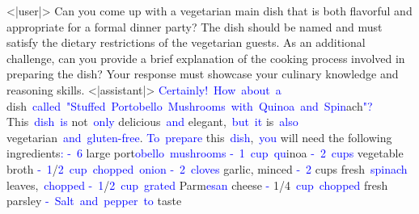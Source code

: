 \documentclass{article}
\begin{document}
\begin{tcolorbox}[colframe=black,colback=white]
<|user|>
Can you come up with a vegetarian main dish that is both flavorful and appropriate for a formal dinner party? The dish should be named and must satisfy the dietary restrictions of the vegetarian guests. As an additional challenge, can you provide a brief explanation of the cooking process involved in preparing the dish? Your response must showcase your culinary knowledge and reasoning skills.
<|assistant|>
\textcolor{blue}{Certainly}\textcolor{blue}{!}\textcolor{blue}{~How}\textcolor{blue}{~about}\textcolor{blue}{~a} dish\textcolor{blue}{~called}\textcolor{blue}{~"}\textcolor{blue}{St}\textcolor{blue}{uffed}\textcolor{blue}{~Port}\textcolor{blue}{ob}\textcolor{blue}{ello}\textcolor{blue}{~Mush}\textcolor{blue}{rooms}\textcolor{blue}{~with}\textcolor{blue}{~Qu}\textcolor{blue}{inoa}\textcolor{blue}{~and}\textcolor{blue}{~Spin}ach\textcolor{blue}{"?} This\textcolor{blue}{~dish}\textcolor{blue}{~is} not\textcolor{blue}{~only} delicious\textcolor{blue}{~and} elegant,\textcolor{blue}{~but}\textcolor{blue}{~it} is\textcolor{blue}{~also} vegetarian\textcolor{blue}{~and}\textcolor{blue}{~gluten}\textcolor{blue}{-free}.
\textcolor{blue}{To}\textcolor{blue}{~prepare} this\textcolor{blue}{~dish},\textcolor{blue}{~you} will need the following ingredients\textcolor{blue}{:
}\textcolor{blue}{-}\textcolor{blue}{~}\textcolor{blue}{6} large port\textcolor{blue}{ob}\textcolor{blue}{ello}\textcolor{blue}{~mushrooms}\textcolor{blue}{
}\textcolor{blue}{-}\textcolor{blue}{~}\textcolor{blue}{1}\textcolor{blue}{~cup}\textcolor{blue}{~qu}inoa\textcolor{blue}{
}\textcolor{blue}{-}\textcolor{blue}{~}\textcolor{blue}{2}\textcolor{blue}{~cups} vegetable broth\textcolor{blue}{
}\textcolor{blue}{-}\textcolor{blue}{~}\textcolor{blue}{1}/\textcolor{blue}{2}\textcolor{blue}{~cup}\textcolor{blue}{~chopped}\textcolor{blue}{~onion}\textcolor{blue}{
}\textcolor{blue}{-}\textcolor{blue}{~}\textcolor{blue}{2}\textcolor{blue}{~cloves} garlic, minced\textcolor{blue}{
}\textcolor{blue}{-}\textcolor{blue}{~}\textcolor{blue}{2} cups fresh\textcolor{blue}{~spinach} leaves,\textcolor{blue}{~chopped}\textcolor{blue}{
}\textcolor{blue}{-}\textcolor{blue}{~}\textcolor{blue}{1}/\textcolor{blue}{2}\textcolor{blue}{~cup}\textcolor{blue}{~grated} Parm\textcolor{blue}{esan} cheese\textcolor{blue}{
}\textcolor{blue}{-} 1/4\textcolor{blue}{~cup}\textcolor{blue}{~chopped} fresh parsley\textcolor{blue}{
}\textcolor{blue}{-}\textcolor{blue}{~Salt}\textcolor{blue}{~and}\textcolor{blue}{~pepper}\textcolor{blue}{~to} taste\textcolor{blue}{
}
\end{tcolorbox}
\end{document}
